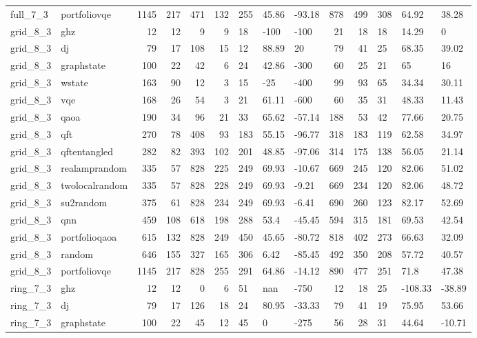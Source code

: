\begin{longtable}{llrrrrlllrrlll}
full\_7\_3 & portfoliovqe & 1145 & 217 & 471 & 132 & 255 & 45.86 & -93.18 & 878 & 499 & 308 & 64.92 & 38.28 \\
grid\_8\_3 & ghz & 12 & 12 & 9 & 9 & 18 & -100 & -100 & 21 & 18 & 18 & 14.29 & 0 \\
grid\_8\_3 & dj & 79 & 17 & 108 & 15 & 12 & 88.89 & 20 & 79 & 41 & 25 & 68.35 & 39.02 \\
grid\_8\_3 & graphstate & 100 & 22 & 42 & 6 & 24 & 42.86 & -300 & 60 & 25 & 21 & 65 & 16 \\
grid\_8\_3 & wstate & 163 & 90 & 12 & 3 & 15 & -25 & -400 & 99 & 93 & 65 & 34.34 & 30.11 \\
grid\_8\_3 & vqe & 168 & 26 & 54 & 3 & 21 & 61.11 & -600 & 60 & 35 & 31 & 48.33 & 11.43 \\
grid\_8\_3 & qaoa & 190 & 34 & 96 & 21 & 33 & 65.62 & -57.14 & 188 & 53 & 42 & 77.66 & 20.75 \\
grid\_8\_3 & qft & 270 & 78 & 408 & 93 & 183 & 55.15 & -96.77 & 318 & 183 & 119 & 62.58 & 34.97 \\
grid\_8\_3 & qftentangled & 282 & 82 & 393 & 102 & 201 & 48.85 & -97.06 & 314 & 175 & 138 & 56.05 & 21.14 \\
grid\_8\_3 & realamprandom & 335 & 57 & 828 & 225 & 249 & 69.93 & -10.67 & 669 & 245 & 120 & 82.06 & 51.02 \\
grid\_8\_3 & twolocalrandom & 335 & 57 & 828 & 228 & 249 & 69.93 & -9.21 & 669 & 234 & 120 & 82.06 & 48.72 \\
grid\_8\_3 & su2random & 375 & 61 & 828 & 234 & 249 & 69.93 & -6.41 & 690 & 260 & 123 & 82.17 & 52.69 \\
grid\_8\_3 & qnn & 459 & 108 & 618 & 198 & 288 & 53.4 & -45.45 & 594 & 315 & 181 & 69.53 & 42.54 \\
grid\_8\_3 & portfolioqaoa & 615 & 132 & 828 & 249 & 450 & 45.65 & -80.72 & 818 & 402 & 273 & 66.63 & 32.09 \\
grid\_8\_3 & random & 646 & 155 & 327 & 165 & 306 & 6.42 & -85.45 & 492 & 350 & 208 & 57.72 & 40.57 \\
grid\_8\_3 & portfoliovqe & 1145 & 217 & 828 & 255 & 291 & 64.86 & -14.12 & 890 & 477 & 251 & 71.8 & 47.38 \\
ring\_7\_3 & ghz & 12 & 12 & 0 & 6 & 51 & nan & -750 & 12 & 18 & 25 & -108.33 & -38.89 \\
ring\_7\_3 & dj & 79 & 17 & 126 & 18 & 24 & 80.95 & -33.33 & 79 & 41 & 19 & 75.95 & 53.66 \\
ring\_7\_3 & graphstate & 100 & 22 & 45 & 12 & 45 & 0 & -275 & 56 & 28 & 31 & 44.64 & -10.71 \\

\end{longtable}
